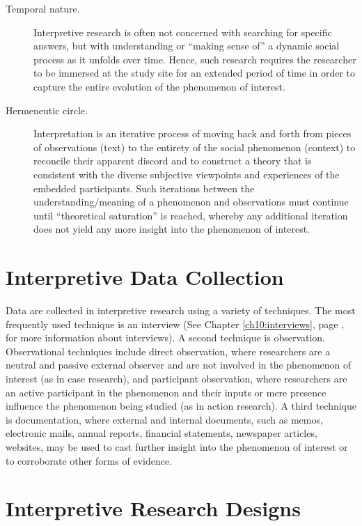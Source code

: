 \begin{description}
	\item[Temporal nature.] Interpretive research is often not concerned with searching for specific answers, but with understanding or ``making sense of'' a dynamic social process as it unfolds over time. Hence, such research requires the researcher to be immersed at the study site for an extended period of time in order to capture the entire evolution of the phenomenon of interest.

	\item[Hermeneutic circle.] Interpretation is an iterative process of moving back and forth from pieces of observations (text) to the entirety of the social phenomenon (context) to reconcile their apparent discord and to construct a theory that is consistent with the diverse subjective viewpoints and experiences of the embedded participants. Such iterations between the understanding/meaning of a phenomenon and observations must continue until ``theoretical saturation'' is reached, whereby any additional iteration does not yield any more insight into the phenomenon of interest.

\end{description}

\section{Interpretive Data Collection}

Data are collected in interpretive research using a variety of techniques. The most frequently used technique is an interview (See Chapter \ref{ch10:interviews}, page \pageref{ch10:interviews}, for more information about interviews). A second technique is observation. Observational techniques include direct observation, where researchers are a neutral and passive external observer and are not involved in the phenomenon of interest (as in case research), and participant observation, where researchers are an active participant in the phenomenon and their inputs or mere presence influence the phenomenon being studied (as in action research). A third technique is documentation, where external and internal documents, such as memos, electronic mails, annual reports, financial statements, newspaper articles, websites, may be used to cast further insight into the phenomenon of interest or to corroborate other forms of evidence.

\section{Interpretive Research Designs}

